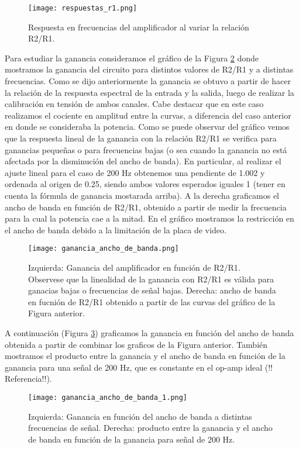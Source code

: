 \documentclass[a4paper, 11pt]{article}
\begin{document}
\begin{figure} [H]
\centering
\texttt{[image: respuestas\_r1.png]}
\caption{ Respuesta en frecuencias del amplificador al variar la relación R2/R1. \label{fig:respuestas_r1}}
\end{figure} 

Para estudiar la ganancia consideramos el gráfico de la Figura \ref{fig:ganancia_ancho_de_banda} donde mostramos la ganancia del circuito para distintos valores de R2/R1 y a distintas frecuencias. Como se dijo anteriormente la ganancia se obtuvo a partir de hacer la relación de la respuesta espectral de la entrada y la salida, luego de realizar la calibración en tensión de ambos canales. Cabe destacar que en este caso realizamos el cociente en amplitud entre la curvas, a diferencia del caso anterior en donde se consideraba la potencia. Como se puede observar del gráfico vemos que la respuesta lineal de la ganancia con la relación R2/R1 se verifica para ganancias pequeñas o para frecuencias bajas (o sea cuando la ganancia no está afectada por la disminución del ancho de banda). En particular, al realizar el ajuste lineal para el caso de 200 Hz obtenemos una pendiente de 1.002 y ordenada al origen de 0.25, siendo ambos valores esperados iguales 1 (tener en cuenta la fórmula de ganancia mostarada arriba). A la derecha graficamos el ancho de banda en función de R2/R1, obtenido a partir de medir la frecuencia para la cual la potencia cae a la mitad. En el gráfico mostramos la restricción en el ancho de banda debido a la limitación de la placa de video.

\begin{figure} [H]
\centering
\texttt{[image: ganancia\_ancho\_de\_banda.png]}
\caption{ Izquierda: Ganancia del amplificador en función de R2/R1. Observese que la linealidad de la ganancia con R2/R1 es válida para ganacias bajas o frecuencias de señal bajas. Derecha: ancho de banda en fucnión de R2/R1 obtenido a partir de las curvas del gráfico de la Figura anterior. \label{fig:ganancia_ancho_de_banda}}
\end{figure} 

A continuación (Figura \ref{fig:ganancia_ancho_de_banda_1}) graficamos la ganancia en función del ancho de banda obtenida a partir de combinar los graficos de la Figura anterior. También mostramos el producto entre la ganancia y el ancho de banda en función de la ganancia para una señal de 200 Hz, que es constante en el op-amp ideal (!! Referencia!!).

\begin{figure} [H]
\centering
\texttt{[image: ganancia\_ancho\_de\_banda\_1.png]}
\caption{ Izquierda: Ganancia en función del ancho de banda a distintas frecuencias de señal. Derecha: producto entre la ganancia y el ancho de banda en función de la ganancia para señal de 200 Hz. \label{fig:ganancia_ancho_de_banda_1}}
\end{figure} 
\end{document}
